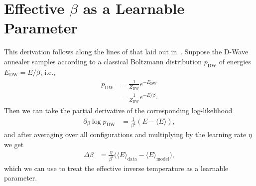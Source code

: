 \section{Effective \( \beta \) as a Learnable Parameter}\label{app:learning_beta}
This derivation follows along the lines of that laid out in~\cite{xu_2021}.
Suppose the D-Wave annealer samples according to a classical Boltzmann distribution \( p_\text{DW} \) of energies \( E_\text{DW} = E / \beta \), i.e.,
\begin{align}
\begin{split}
    p_\text{DW}
        &= \frac{1}{Z_\text{DW}} e^{-E_\text{DW}} \\
        &= \frac{1}{Z_\text{DW}} e^{-E / \beta}.
\end{split}
\end{align}
Then we can take the partial derivative of the corresponding log-likelihood
\begin{align}
    \partial_{\beta} \log p_\text{DW}
        &= \frac{1}{\beta^2} (E - \langle E \rangle),
\end{align}
and after averaging over all configurations and multiplying by the learning rate \( \eta \) we get
\begin{align}
    \Delta\beta
        &= \frac{\eta}{\beta^2}\big(\langle E \rangle_\text{data} - \langle E \rangle_\text{model}\big),
\end{align}
which we can use to treat the effective inverse temperature as a learnable parameter.
